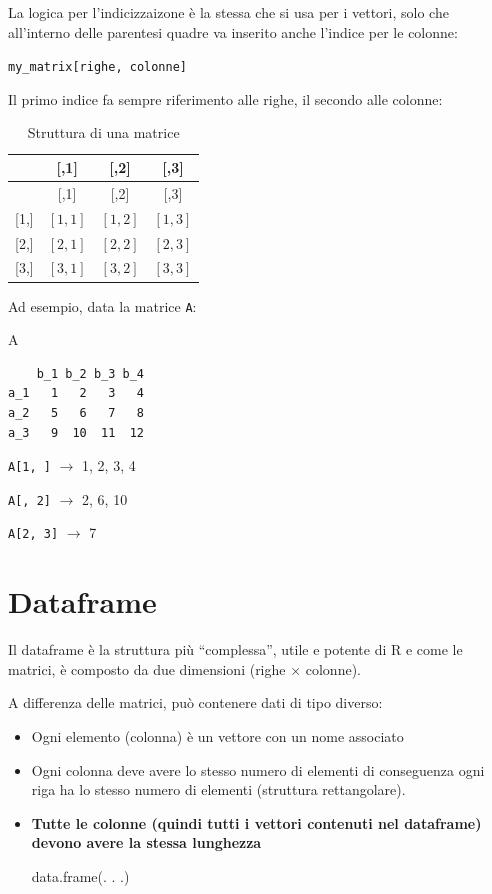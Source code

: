 \documentclass[
  a4paper,
  DIV=11,
  numbers=noendperiod]{scrreprt}
\newenvironment{Shaded}{\begin{snugshade}}{\end{snugshade}}
\newcommand{\NormalTok}[1]{#1}
\begin{document}
La logica per l'indicizzaizone è la stessa che si usa per i vettori,
solo che all'interno delle parentesi quadre va inserito anche l'indice
per le colonne:

\texttt{my\_matrix{[}righe,\ colonne{]}}

Il primo indice fa sempre riferimento alle righe, il secondo alle
colonne:

\begin{longtable}[]{@{}lccc@{}}
\caption{Struttura di una matrice}\tabularnewline
\toprule\noalign{}
& {[},1{]} & {[},2{]} & {[},3{]} \\
\midrule\noalign{}
\endfirsthead
\toprule\noalign{}
& {[},1{]} & {[},2{]} & {[},3{]} \\
\midrule\noalign{}
\endhead
\bottomrule\noalign{}
\endlastfoot
{[}1,{]} & \([1, 1]\) & \([1, 2]\) & \([1, 3]\) \\
{[}2,{]} & \([2, 1]\) & \([2, 2]\) & \([2, 3]\) \\
{[}3,{]} & \([3, 1]\) & \([3, 2]\) & \([3, 3]\) \\
\end{longtable}

Ad esempio, data la matrice \texttt{A}:

\begin{Shaded}
\begin{Highlighting}[]
\NormalTok{A}
\end{Highlighting}
\end{Shaded}

\begin{verbatim}
    b_1 b_2 b_3 b_4
a_1   1   2   3   4
a_2   5   6   7   8
a_3   9  10  11  12
\end{verbatim}

\texttt{A{[}1,\ {]}} \(\rightarrow\) 1, 2, 3, 4

\texttt{A{[},\ 2{]}} \(\rightarrow\) 2, 6, 10

\texttt{A{[}2,\ 3{]}} \(\rightarrow\) 7

\section{Dataframe}\label{dataframe}

Il dataframe è la struttura più ``complessa'', utile e potente di R e
come le matrici, è composto da due dimensioni (righe \(\times\)
colonne).

A differenza delle matrici, può contenere dati di tipo diverso:

\begin{itemize}
\item
  Ogni elemento (colonna) è un vettore con un nome associato
\item
  Ogni colonna deve avere lo stesso numero di elementi di conseguenza
  ogni riga ha lo stesso numero di elementi (struttura rettangolare).
\item
  \textbf{Tutte le colonne (quindi tutti i vettori contenuti nel
  dataframe) devono avere la stessa lunghezza}

  data.frame(. . .)
\end{itemize}
\end{document}
